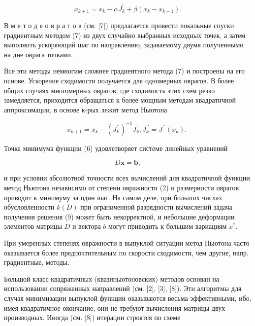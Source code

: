 \documentclass[10pt]{article}
\begin{document}
\[

x_{k+1}=x_{k}-\alpha J_{k}^{\prime}+\beta\left(x_{k}-x_{k-1}\right) .

\]



В м е т о д е о в р а г о в (см. [7]) предлагается провести локальные спуски градиентным методом (7) из двух случайно выбранных исходных точек, а затем выполнить ускоряющий шаг по направлению, задаваемому двумя полученными на дне оврага точками.



Все эти методы немногим сложнее градиентного метода (7) и построены на его основе. Ускорение сходимости получается для одномерных оврагов. В более общих случаях многомерных оврагов, где сходимость этих схем резко замедляется, приходится обращаться к более мощным методам квадратичной аппроксимации, в основе к-рых лежит метод Ньютона



\[

x_{k+1}=x_{k}-\left(J_{k}^{\prime \prime}\right)^{-1} J_{k}^{\prime}, J_{k}^{\prime \prime}=J^{\prime \prime}\left(x_{k}\right) \text {. }

\]



Точка минимума функции (6) удовлетворяет системе линейных уравнений



\[

D \boldsymbol{x}=\boldsymbol{b},

\]



и при условии абсолютной точности всех вычислений для квадратичной функции метод Ньютона независимо от степени овражности (2) и размерности оврагов приводит к минимуму за один шаг. На самом деле, при больших числах обусловленности $k(D)$ при ограниченной разрядности вычислений задача получения решения (9) может быть некорректной, и небольшие деформации элементов матрицы $D$ и вектора $b$ могут приводить к большим вариациям $x^{*}$.



При умеренных степенях овражности в выпуклой ситуации метод Ньютона часто оказывается более предпочтительным по скорости сходимости, чем другие, напр. градиентные, методы.



Большой класс квадратичных (квазиньютоновских) методов основан на использовании сопряженных направлений (см. [2], [3], [8]). Эти алгоритмы для случая минимизации выпуклой функции оказываются весьма эффективными, ибо, имея квадратичное окончание, они не требуют вычисления матрицы двух производных. Иногда (см. [8]) итерации строятся по схеме
\end{document}
